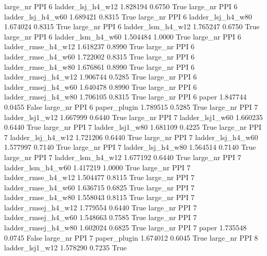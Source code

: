   large_nr      PPI                 6   ladder_lsj_h4_w12   1.828194      0.6750    True
  large_nr      PPI                 6   ladder_lsj_h4_w60   1.689421      0.8315    True
  large_nr      PPI                 6   ladder_lsj_h4_w80   1.674024      0.8315    True
  large_nr      PPI                 6   ladder_lsm_h4_w12   1.765247      0.6750    True
  large_nr      PPI                 6   ladder_lsm_h4_w60   1.504484      1.0000    True
  large_nr      PPI                 6  ladder_rmse_h4_w12   1.618237      0.8990    True
  large_nr      PPI                 6  ladder_rmse_h4_w60   1.722002      0.8315    True
  large_nr      PPI                 6  ladder_rmse_h4_w80   1.676861      0.8990    True
  large_nr      PPI                 6 ladder_rmsej_h4_w12   1.906744      0.5285    True
  large_nr      PPI                 6 ladder_rmsej_h4_w60   1.640478      0.8990    True
  large_nr      PPI                 6 ladder_rmsej_h4_w80   1.706105      0.8315    True
  large_nr      PPI                 6               paper   1.847744      0.0455   False
  large_nr      PPI                 6        paper_plugin   1.789515      0.5285    True
  large_nr      PPI                 7     ladder_lsj1_w12   1.667999      0.6440    True
  large_nr      PPI                 7     ladder_lsj1_w60   1.660235      0.6440    True
  large_nr      PPI                 7     ladder_lsj1_w80   1.681109      0.4225    True
  large_nr      PPI                 7   ladder_lsj_h4_w12   1.721206      0.6440    True
  large_nr      PPI                 7   ladder_lsj_h4_w60   1.577997      0.7140    True
  large_nr      PPI                 7   ladder_lsj_h4_w80   1.564514      0.7140    True
  large_nr      PPI                 7   ladder_lsm_h4_w12   1.677192      0.6440    True
  large_nr      PPI                 7   ladder_lsm_h4_w60   1.417219      1.0000    True
  large_nr      PPI                 7  ladder_rmse_h4_w12   1.504477      0.8115    True
  large_nr      PPI                 7  ladder_rmse_h4_w60   1.636715      0.6825    True
  large_nr      PPI                 7  ladder_rmse_h4_w80   1.558043      0.8115    True
  large_nr      PPI                 7 ladder_rmsej_h4_w12   1.779554      0.6440    True
  large_nr      PPI                 7 ladder_rmsej_h4_w60   1.548663      0.7585    True
  large_nr      PPI                 7 ladder_rmsej_h4_w80   1.602024      0.6825    True
  large_nr      PPI                 7               paper   1.735548      0.0745   False
  large_nr      PPI                 7        paper_plugin   1.674012      0.6045    True
  large_nr      PPI                 8     ladder_lsj1_w12   1.578290      0.7235    True
